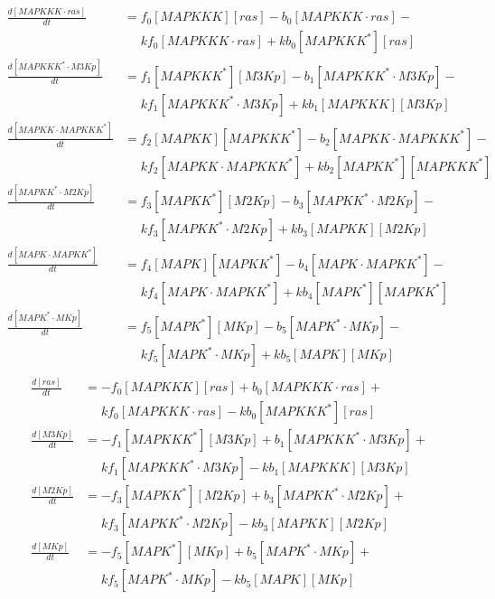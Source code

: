 \begin{equation*}
  \begin{align*}
    \frac{d[MAPKKK\cdot{}ras]}{dt} &= f_{0}[MAPKKK][ras] - b_{0}[MAPKKK\cdot{}ras] -\\
    &\phantom{=} kf_{0}[MAPKKK\cdot{}ras] + kb_{0}[MAPKKK^{*}][ras]\\
    \frac{d[MAPKKK^{*}\cdot{}M3Kp]}{dt} &= f_{1}[MAPKKK^{*}][M3Kp] - b_{1}[MAPKKK^{*}\cdot{}M3Kp] -\\
    &\phantom{=} kf_{1}[MAPKKK^{*}\cdot{}M3Kp] + kb_{1}[MAPKKK][M3Kp]\\
    \frac{d[MAPKK\cdot{}MAPKKK^{*}]}{dt} &= f_{2}[MAPKK][MAPKKK^{*}] - b_{2}[MAPKK\cdot{}MAPKKK^{*}] -\\
    &\phantom{=} kf_{2}[MAPKK\cdot{}MAPKKK^{*}] + kb_{2}[MAPKK^{*}][MAPKKK^{*}]\\
    \frac{d[MAPKK^{*}\cdot{}M2Kp]}{dt} &= f_{3}[MAPKK^{*}][M2Kp] - b_{3}[MAPKK^{*}\cdot{}M2Kp] -\\
    &\phantom{=} kf_{3}[MAPKK^{*}\cdot{}M2Kp] + kb_{3}[MAPKK][M2Kp]\\
    \frac{d[MAPK\cdot{}MAPKK^{*}]}{dt} &= f_{4}[MAPK][MAPKK^{*}] - b_{4}[MAPK\cdot{}MAPKK^{*}] -\\
    &\phantom{=} kf_{4}[MAPK\cdot{}MAPKK^{*}] + kb_{4}[MAPK^{*}][MAPKK^{*}]\\
    \frac{d[MAPK^{*}\cdot{}MKp]}{dt} &= f_{5}[MAPK^{*}][MKp] - b_{5}[MAPK^{*}\cdot{}MKp] -\\
    &\phantom{=} kf_{5}[MAPK^{*}\cdot{}MKp] + kb_{5}[MAPK][MKp]\\
  \end{align*}
\end{equation*}
\begin{equation*}
  \begin{align*}
    \frac{d[ras]}{dt} &= -f_{0}[MAPKKK][ras] + b_{0}[MAPKKK\cdot{}ras] +\\
    &\phantom{=} kf_{0}[MAPKKK\cdot{}ras] - kb_{0}[MAPKKK^{*}][ras]\\
    \frac{d[M3Kp]}{dt} &= -f_{1}[MAPKKK^{*}][M3Kp] + b_{1}[MAPKKK^{*}\cdot{}M3Kp] +\\
    &\phantom{=} kf_{1}[MAPKKK^{*}\cdot{}M3Kp] - kb_{1}[MAPKKK][M3Kp]\\
    \frac{d[M2Kp]}{dt} &= -f_{3}[MAPKK^{*}][M2Kp] + b_{3}[MAPKK^{*}\cdot{}M2Kp] +\\
    &\phantom{=} kf_{3}[MAPKK^{*}\cdot{}M2Kp] - kb_{3}[MAPKK][M2Kp]\\
    \frac{d[MKp]}{dt} &= -f_{5}[MAPK^{*}][MKp] + b_{5}[MAPK^{*}\cdot{}MKp] +\\
    &\phantom{=} kf_{5}[MAPK^{*}\cdot{}MKp] - kb_{5}[MAPK][MKp]\\
  \end{align*}
\end{equation*}
\normalsize

